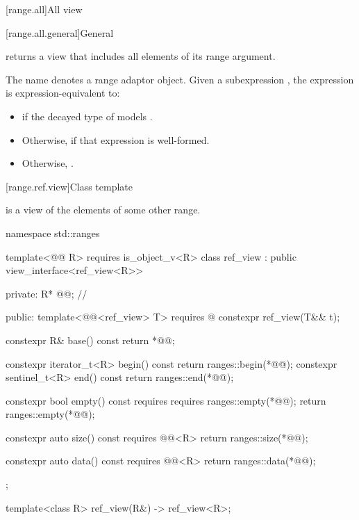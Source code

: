 [range.all]{All view}

[range.all.general]{General}

\pnum
{}%
 returns a view that includes all elements of
its range argument.

\pnum
The name  denotes a
range adaptor object.
Given a subexpression , the expression
 is expression-equivalent to:
\begin{itemize}
\item {} if the decayed type of 
models .

\item Otherwise,  if that expression is well-formed.

\item Otherwise, .
\end{itemize}

[range.ref.view]{Class template }

\pnum
{} is a view of the elements of some other range.
%
\begin{codeblock}
namespace std::ranges {
  template<@@ R>
    requires is_object_v<R>
  class ref_view : public view_interface<ref_view<R>> {
  private:
    R* @@;                      // \expos

  public:
    template<@@<ref_view> T>
      requires @\seebelow@
    constexpr ref_view(T&& t);

    constexpr R& base() const { return *@@; }

    constexpr iterator_t<R> begin() const { return ranges::begin(*@@); }
    constexpr sentinel_t<R> end() const { return ranges::end(*@@); }

    constexpr bool empty() const
      requires requires { ranges::empty(*@@); }
    { return ranges::empty(*@@); }

    constexpr auto size() const requires @@<R>
    { return ranges::size(*@@); }

    constexpr auto data() const requires @@<R>
    { return ranges::data(*@@); }
  };

  template<class R>
    ref_view(R&) -> ref_view<R>;
}
\end{codeblock}

